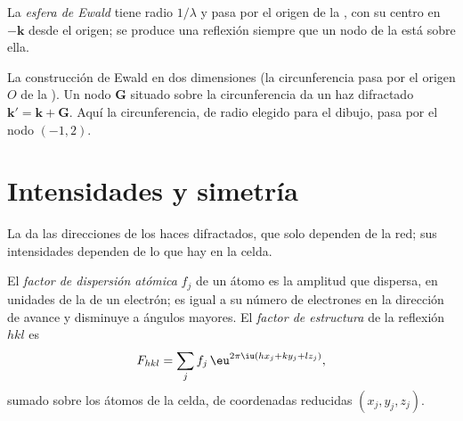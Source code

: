 \begin{definition}\label{def:b3:x-ray-diffraction:ewald}
La \emph{esfera de Ewald} tiene radio $1/\lambda$ y pasa por
el origen de la , con su centro en $-\mathbf k$ desde el origen; se
produce una reflexión siempre que un nodo de la  está sobre ella.
\end{definition}

\begin{omfigure}

{\small La construcción de Ewald en dos dimensiones (la circunferencia pasa por el
origen $O$ de la ). Un nodo $\mathbf G$ situado sobre la circunferencia da un
haz difractado $\mathbf k' = \mathbf k + \mathbf G$. Aquí la circunferencia, de radio elegido para el
dibujo, pasa por el nodo $(-1, 2)$.}
\end{omfigure}

\section{Intensidades y simetría}

La  da las direcciones de los haces difractados, que solo dependen de
la red; sus intensidades dependen de lo que hay en la celda.

\begin{definition}\label{def:b3:x-ray-diffraction:structure-factor}
El \emph{factor de dispersión atómica} $f_j$ de un
átomo es la amplitud que dispersa, en unidades de la de un electrón; es igual a
su número de electrones en la dirección de avance y disminuye a ángulos
mayores. El \emph{factor de estructura} de la reflexión $hkl$ es
\[
F_{hkl} = \sum_jf_j\,\eu^{2\pi\iu(hx_j + ky_j + lz_j)},
\]
sumado sobre los átomos de la celda, de coordenadas reducidas $(x_j, y_j, z_j)$.
\end{definition}

